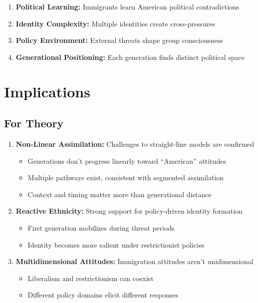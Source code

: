 \documentclass[11pt,letterpaper]{article}
\begin{document}
\begin{enumerate}
    \item \textbf{Political Learning:} Immigrants learn American political contradictions
    \item \textbf{Identity Complexity:} Multiple identities create cross-pressures
    \item \textbf{Policy Environment:} External threats shape group consciousness
    \item \textbf{Generational Positioning:} Each generation finds distinct political space
\end{enumerate}

\section{Implications}

\subsection{For Theory}

\begin{enumerate}
    \item \textbf{Non-Linear Assimilation:} Challenges to straight-line models are confirmed
        \begin{itemize}
            \item Generations don't progress linearly toward ``American'' attitudes
            \item Multiple pathways exist, consistent with segmented assimilation
            \item Context and timing matter more than generational distance
        \end{itemize}
    
    \item \textbf{Reactive Ethnicity:} Strong support for policy-driven identity formation
        \begin{itemize}
            \item First generation mobilizes during threat periods
            \item Identity becomes more salient under restrictionist policies
        \end{itemize}
    
    \item \textbf{Multidimensional Attitudes:} Immigration attitudes aren't unidimensional
        \begin{itemize}
            \item Liberalism and restrictionism can coexist
            \item Different policy domains elicit different responses
        \end{itemize}
\end{enumerate}
\end{document}
